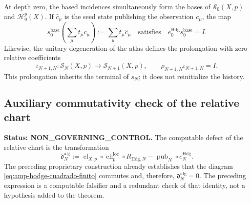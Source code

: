 At depth zero, the based incidences simultaneously form the bases
of \(\mathscr S_0(X,p)\) and \(\mathscr H_0^p(X)\). If
\(\widehat c_\mu\) is the seed state publishing the observation
\(c_\mu\), the map
\begin{equation}\label{eq:amp-hodge-seccion-base}
 s_0^{\mathrm{base}}
 \left(\sum_\mu t_\mu c_\mu\right)
 :=\sum_\mu t_\mu\widehat c_\mu
 \quad\text{satisfies}\quad
 e_0^{\mathrm{Hdg}}s_0^{\mathrm{base}}=I.
\end{equation}
Likewise, the unitary degeneration of the atlas defines the prolongation with
zero relative coefficients
\begin{equation}\label{eq:amp-hodge-extension-cero}
 \iota_{N+1,N}:\mathscr S_N(X,p)\longrightarrow
 \mathscr S_{N+1}(X,p),
 \qquad
 \rho_{N+1,N}\iota_{N+1,N}=I.
\end{equation}
This prolongation inherits the terminal of \(s_N\); it does not reinitialize the history.

\subsection{Auxiliary commutativity check of the relative chart}
\label{subsec:amp-hodge-control-conmutatividad-relativa}

\noindent\textbf{Status: NON\_GOVERNING\_CONTROL.}
The computable defect of the relative chart is the transformation
\begin{equation}\label{eq:amp-hodge-defecto-puente-algebraico}
 \mathfrak d_N^{\mathrm{alg}}
 :=\operatorname{cl}_{X,p}\circ\operatorname{ch}^{\mathrm{loc}}_p
   \circ R_{\mathrm{Hdg},N}
   -\operatorname{pub}_N\circ e_N^{\mathrm{Hdg}}.
\end{equation}
The preceding proprietary construction already establishes that the diagram
\eqref{eq:amp-hodge-cuadrado-finito} commutes and, therefore,
\(\mathfrak d_N^{\mathrm{alg}}=0\). The preceding expression is a computable
falsifier and a redundant check of that identity, not a hypothesis
added to the theorem.

